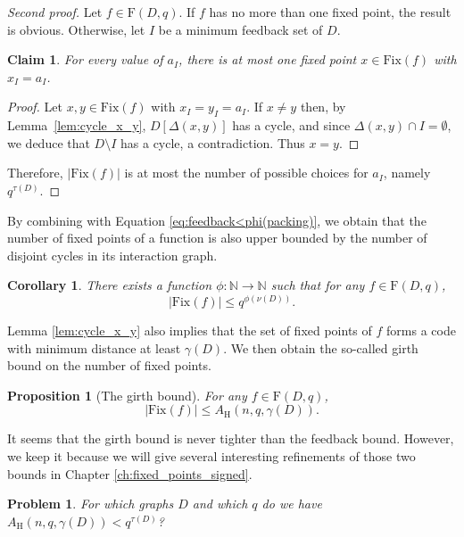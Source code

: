 \documentclass[a4paper, 11pt]{book}
\numberwithin{equation}{section}
\theoremstyle{plain}
\newtheorem{corollary}	[equation]	{Corollary}
\newtheorem{problem}	[equation]	{Problem}
\newtheorem{proposition}[equation]	{Proposition}
\newtheorem{claim}		[equation]	{Claim}
\newcommand{\feedback}{\tau}
\newcommand{\girth}{\gamma}
\newcommand{\packing}{\nu}
\newcommand{\functions}{\mathrm{F}}
\newcommand{\Fix}{\mathrm{Fix}}
\newcommand{\AH}{A_\mathrm{H}}
\renewcommand{\(}{\ldbrack}
\renewcommand{\)}{\rdbrack}
\newcommand{\N}{\mathbb{N}}
\begin{document}
\begin{proof}[Second proof]
Let $f \in \functions(D,q)$. If $f$ has no more than one fixed point, the result is obvious. Otherwise, let $I$ be a minimum feedback set of $D$.

\begin{claim}
For every value of $a_I$, there is at most one fixed point $x \in \Fix(f)$ with $x_I = a_I$.
\end{claim}

\begin{proof}
Let $x, y \in \Fix(f)$ with $x_I = y_I = a_I$. If $x\neq y$ then, by Lemma~\ref{lem:cycle_x_y}, $D[\Delta(x,y)]$ has a cycle, and since $\Delta(x,y)\cap I=\emptyset$, we deduce that $D\setminus I$ has a cycle, a contradiction. Thus $x=y$. 
\end{proof}

Therefore, $|\Fix(f)|$ is at most the number of possible choices for $a_I$, namely $q^{\feedback(D)}$.

\end{proof}

By combining with Equation \eqref{eq:feedback<phi(packing)}, we obtain that the number of fixed points of a function is also upper bounded by the number of disjoint cycles in its interaction graph.

\begin{corollary} \label{cor:fix<phi(packing)}
There exists a function $\phi: \N \to \N$ such that for any $f \in \functions(D,q)$,
\[
	|\Fix(f)| \le q^{\phi(\packing(D))}.
\]
\end{corollary}


Lemma \ref{lem:cycle_x_y} also implies that the set of fixed points of $f$ forms a code with minimum distance at least $\girth(D)$. We then obtain the so-called girth bound on the number of fixed points.

\begin{proposition}[The girth bound] \label{prop:girth_bound}
For any $f \in \functions(D,q)$,
\[
	|\Fix(f)| \le \AH(n, q, \girth(D)).
\] 
\end{proposition}

It seems that the girth bound is never tighter than the feedback bound. However, we keep it because we will give several interesting refinements of those two bounds in Chapter \ref{ch:fixed_points_signed}.

\begin{problem}
For which graphs $D$ and which $q$ do we have $\AH(n, q, \girth(D)) < q^{\feedback(D)}$?
\end{problem}
\end{document}
